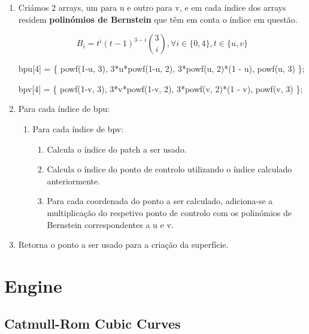 \documentclass[a4paper]{article}
\begin{document}
\ttfamily
\begin{enumerate}
  \item Criámos 2 arrays, um para u e outro para v, e em cada índice dos arrays residem \textbf{polinómios de Bernstein} que têm em conta o índice em questão.
  \vspace{0.5cm}

  \hspace{0.0cm} $$B_{i} = t^i (t-1)^{3-i} \binom{3}{i}  , \forall i \in \{0,4\}, t \in \{u,v\}$$

  \vspace{0.5cm}
  
  \hspace{-2.8cm}bpu[4] = \{ powf(1-u, 3), 3*u*powf(1-u, 2), 3*powf(u, 2)*(1 - u), powf(u, 3) \};
  
  \vspace{0.5cm}
  
  \hspace{-2.8cm}bpv[4] = \{ powf(1-v, 3), 3*v*powf(1-v, 2), 3*powf(v, 2)*(1 - v), powf(v, 3) \};
  
  \vspace{0.5cm}
  
  \item Para cada índice de bpu:
  \begin{enumerate}
  	\item Para cada índice de bpv:
	\begin{enumerate}
		\item Calcula o índice do patch a ser usado.
		\item Calcula o índice do ponto de controlo utilizando o índice calculado anteriormente.
		\item Para cada coordenada do ponto a ser calculado, adiciona-se a multiplicação do respetivo ponto de controlo com os polinómios de Bernstein correspondentes a u e v.
	\end{enumerate}
  \end{enumerate}
  \item Retorna o ponto a ser usado para a criação da superfície.
\end{enumerate}
\rmfamily





\section{Engine}
\label{sec:engine}

\subsection{Catmull-Rom Cubic Curves}
\label{sec:catmullrom}
\end{document}
